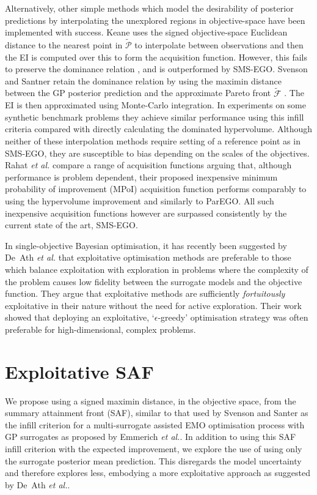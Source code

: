 \documentclass[conference]{IEEEtran}
\makeatletter
\newcommand\hpv{dominated hypervolume\xspace}
\newcommand\smsego{SMS-EGO\xspace}
\newcommand\ei{EI\xspace}
\newcommand\gp{GP\xspace}
\newcommand\maximin{maximin\xspace}
\newcommand\Papprox{\tilde{\mathcal{P}}}
\newcommand\Fapprox{\tilde{\mathcal{F}}}
\newcommand*{\etal}{\textit{et al.}\@\xspace}
\makeatother
\begin{document}
Alternatively, other simple methods which model the desirability of posterior predictions by interpolating the unexplored regions in objective-space have been implemented with success. Keane \cite{keane2006statistical} uses the signed objective-space Euclidean distance to the nearest point in $\Papprox$ to interpolate between observations and then the \ei is computed over this to form the acquisition function. However, 
this fails to preserve the dominance relation \cite{wagner2010expected}, and is outperformed by \smsego. Svenson and Santner retain the dominance relation by using the maximin distance between the \gp posterior prediction and the approximate Pareto front  $\Fapprox$ \cite{svenson2016multiobjective}. The \ei is then approximated using Monte-Carlo integration. In experiments on some synthetic benchmark problems they achieve similar performance using this infill criteria compared with directly calculating the \hpv.
Although neither of these interpolation methods require setting of a reference point as in \smsego, they are susceptible to bias depending on the scales of the objectives. Rahat \etal \cite{rahat2017alternative} compare a range of acquisition functions arguing that, although performance is problem dependent, their proposed inexpensive minimum probability of improvement (MPoI) acquisition function performs comparably to using the hypervolume improvement and similarly to ParEGO. All such inexpensive acquisition functions however are surpassed consistently by the current state of the art, \smsego.

In single-objective Bayesian optimisation, it has recently been suggested by De~Ath \etal \cite{death2019greed} that exploitative optimisation methods are preferable to those which balance exploitation with exploration in problems where the complexity of the problem causes low fidelity between the surrogate models and the objective function. They argue that exploitative methods are sufficiently \textit{fortuitously} exploitative in their nature without the need for active exploration. Their work showed that deploying an exploitative, `$\epsilon$-greedy' optimisation strategy was often preferable for high-dimensional, complex problems.


\section{Exploitative SAF}\label{section:our_method}
We propose using a signed \maximin distance, in the objective space, from
the summary attainment front (SAF), similar to that used by Svenson and
Santer \cite{svenson2016multiobjective} as the infill criterion for a
multi-surrogate assisted EMO optimisation process with \gp surrogates as
proposed by Emmerich \etal \cite{emmerich2006single}.   In addition to
using this SAF infill criterion with the expected improvement, we explore the use of using only the surrogate posterior mean prediction. This disregards the model uncertainty and therefore explores less, embodying  a more exploitative approach  as suggested by De~Ath \etal \cite{death2019greed}. 
\end{document}
